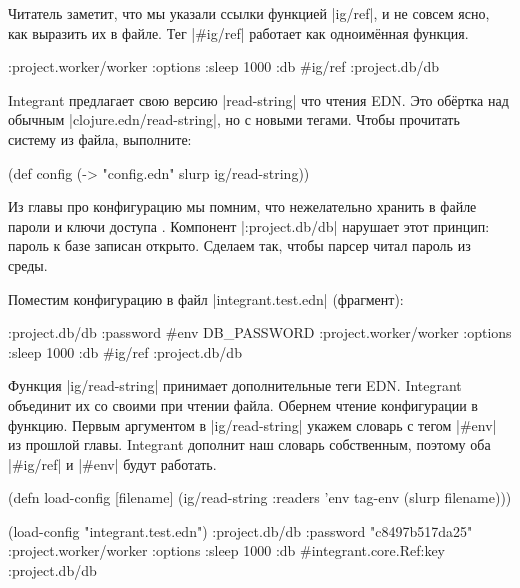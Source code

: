 Читатель заметит, что мы указали ссылки функцией \spverb|ig/ref|, и не совсем
ясно, как выразить их в файле. Тег \spverb|#ig/ref| работает как одноим\"{е}нная
функция.

\begin{english}
  \begin{clojure}
{:project.worker/worker {:options {:sleep 1000}
                         :db #ig/ref :project.db/db}}
  \end{clojure}
\end{english}

Integrant предлагает свою версию \spverb|read-string| что чтения EDN. Это
об\"{е}ртка над обычным \spverb|clojure.edn/read-string|, но с новыми тегами. Чтобы
прочитать систему из файла, выполните:

\begin{english}
  \begin{clojure}
(def config
  (-> "config.edn" slurp ig/read-string))
  \end{clojure}
\end{english}

Из главы про конфигурацию мы помним, что нежелательно хранить в файле пароли и
ключи доступа . Компонент \spverb|:project.db/db| нарушает
этот принцип: пароль к базе записан открыто. Сделаем так, чтобы парсер читал
пароль из среды.

Поместим конфигурацию в файл \spverb|integrant.test.edn| (фрагмент):

\begin{english}
  \begin{clojure}
{:project.db/db {:password #env DB_PASSWORD}
 :project.worker/worker {:options {:sleep 1000}
                         :db #ig/ref :project.db/db}}
  \end{clojure}
\end{english}

Функция \spverb|ig/read-string| принимает дополнительные теги EDN. Integrant
объединит их со своими при чтении файла. Обернем чтение конфигурации в
функцию. Первым аргументом в \spverb|ig/read-string| укажем словарь с тегом
\spverb|#env| из прошлой главы. Integrant дополнит наш словарь собственным,
поэтому оба \spverb|#ig/ref| и \spverb|#env| будут работать.

\begin{english}
  \begin{clojure}
(defn load-config [filename]
  (ig/read-string {:readers {'env tag-env}}
                  (slurp filename)))

(load-config "integrant.test.edn")
{:project.db/db {:password "c8497b517da25"}
 :project.worker/worker
 {:options {:sleep 1000}
  :db #integrant.core.Ref{:key :project.db/db}}}
  \end{clojure}
\end{english}


